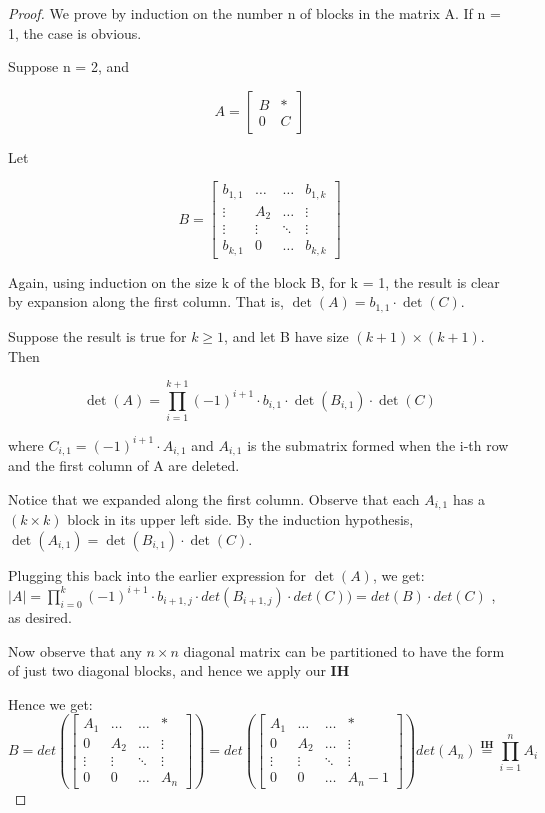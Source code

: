 \documentclass[12pt]{article}
\begin{document}
\begin{proof}
We prove by induction on the number n of blocks in the matrix A. If n = 1, the case is obvious.

Suppose n = 2, and

\[
A = \begin{bmatrix}
B & * \\
0 & C
\end{bmatrix}
\]

Let

\[
B = \begin{bmatrix}
b_{1,1} & \ldots & \ldots & b_{1,k} \\
\vdots & A_2 & \ldots & \vdots \\
\vdots & \vdots & \ddots & \vdots \\
b_{k,1} & 0 & \ldots & b_{k,k}
\end{bmatrix}
\]

Again, using induction on the size k of the block B, for k = 1, the result is clear by expansion along the first column. That is, \( \det(A) = b_{1,1} \cdot \det(C) \).

Suppose the result is true for \( k \geq 1 \), and let B have size \((k+1) \times (k+1)\). Then

\[
\det(A) = \prod_{i=1}^{k+1} (-1)^{i+1} \cdot b_{i,1} \cdot \det(B_{i,1}) \cdot \det(C)
\]

where \( C_{i,1} = (-1)^{i+1} \cdot A_{i,1} \) and \( A_{i,1} \) is the submatrix formed when the i-th row and the first column of A are deleted.

Notice that we expanded along the first column. Observe that each \( A_{i,1} \) has a \( (k \times k) \) block in its upper left side. By the induction hypothesis, \( \det(A_{i,1}) = \det(B_{i,1}) \cdot \det(C) \).

Plugging this back into the earlier expression for \( \det(A) \), we get: \(|A| = \prod_{i=0}^{k} (-1)^{i+1} \cdot b_{i+1,j} \cdot det(B_{i+1,j}) \cdot det(C)) = det(B)\cdot det(C)\) , as desired.

Now observe that any $n \times n$ diagonal matrix can be partitioned to have the form of just two diagonal blocks, and hence we apply our \textbf{IH} 

Hence we get:
\[
B = det(\begin{bmatrix}
A_1 & \ldots & \ldots & * \\
0 & A_2 & \ldots & \vdots \\
\vdots & \vdots & \ddots & \vdots \\
0 & 0 & \ldots & A_n
\end{bmatrix}) = det(\begin{bmatrix}
A_1 & \ldots & \ldots & * \\
0 & A_2 & \ldots & \vdots \\
\vdots & \vdots & \ddots & \vdots \\
0 & 0 & \ldots & A_n-1
\end{bmatrix}) det(A_n) \stackrel{\textbf{IH}}{=} \prod_{i=1}^{n} A_{i}
\]
\end{proof}
\end{document}
